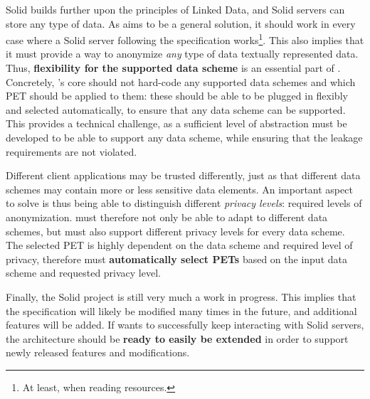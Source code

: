 Solid builds further upon the principles of Linked Data, and Solid servers can store any type of data. As \middleware{} aims to be a general solution, it should work in every case where a Solid server following the specification works\footnote{At least, when reading resources.}. This also implies that it must provide a way to anonymize \textit{any} type of data textually represented data. Thus, \textbf{flexibility for the supported data scheme} is an essential part of \middleware{}. Concretely, \middleware{}'s core should not hard-code any supported data schemes and which PET should be applied to them: these should be able to be plugged in flexibly and selected automatically, to ensure that any data scheme can be supported. This provides a technical challenge, as a sufficient level of abstraction must be developed to be able to support any data scheme, while ensuring that the leakage requirements are not violated.

Different client applications may be trusted differently, just as that different data schemes may contain more or less sensitive data elements. An important aspect to solve is thus being able to distinguish different \textit{privacy levels}: required levels of anonymization. \middleware{} must therefore not only be able to adapt to different data schemes, but must also support different privacy levels for every data scheme. The selected PET is highly dependent on the data scheme and required level of privacy, therefore \middleware{} must \textbf{automatically select \gls{PETs}} based on the input data scheme and requested privacy level.

Finally, the Solid project is still very much a work in progress. This implies that the specification will likely be modified many times in the future, and additional features will be added. If \middleware{} wants to successfully keep interacting with Solid servers, the architecture should be \textbf{ready to easily be extended} in order to support newly released features and modifications. 

